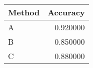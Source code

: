 \begin{tabular}{lr}
\toprule
Method & Accuracy \\
\midrule
A & 0.920000 \\
B & 0.850000 \\
C & 0.880000 \\
\bottomrule
\end{tabular}
